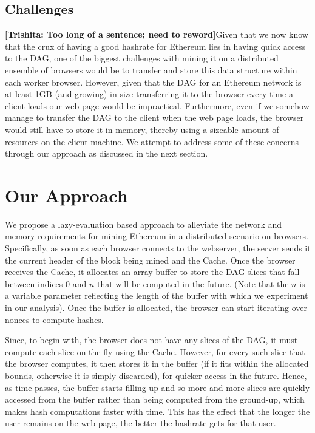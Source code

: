 \documentclass[runningheads]{llncs}
\newcommand{\trishita}[1]{{\color{magenta}\bfseries[Trishita: #1]}}
\begin{document}
\subsection{Challenges}
\trishita{Too long of a sentence; need to reword}Given that we now know that the crux of having a good hashrate for Ethereum lies in having quick access to the DAG, one of the biggest challenges with mining it on a distributed ensemble of browsers would be to transfer and store this data structure within each worker browser. However, given that the DAG for an Ethereum network is at least 1GB (and growing) in size transferring it to the browser every time a client loads our web page would be impractical. Furthermore, even if we somehow manage to transfer the DAG to the client when the web page loads, the browser would still have to store it in memory, thereby using a sizeable amount of resources on the client machine. We attempt to address some of these concerns through our approach as discussed in the next section. 

\section{Our Approach}
We propose a lazy-evaluation based approach to alleviate the network and memory requirements for mining Ethereum in a distributed scenario on browsers. Specifically, as soon as each browser connects to the webserver, the server sends it the current header of the block being mined and the Cache. Once the browser receives the Cache, it allocates an array buffer to store the DAG slices that fall between indices 0 and $n$ that will be computed in the future. (Note that the $n$ is a variable parameter reflecting the length of the buffer with which we experiment in our analysis). Once the buffer is allocated, the browser can start iterating over nonces to compute hashes.  

Since, to begin with, the browser does not have any slices of the DAG, it must compute each slice on the fly using the Cache. However, for every such slice that the browser computes, it then stores it in the buffer (if it fits within the allocated bounds, otherwise it is simply discarded), for quicker access in the future. Hence, as time passes, the buffer starts filling up and so more and more slices are quickly accessed from the buffer rather than being computed from the ground-up, which makes hash computations faster with time. This has the effect that the longer the user remains on the web-page, the better the hashrate gets for that user. 
\end{document}
